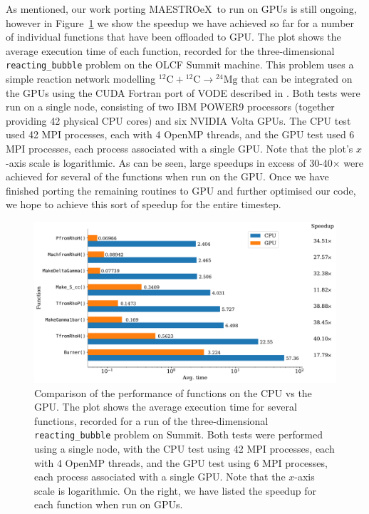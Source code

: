 \documentclass[a4paper]{jpconf}
\newcommand{\maestroex}{{\sffamily MAESTROeX}}
\begin{document}
As mentioned, our work porting \maestroex~to run on GPUs is still ongoing, however in Figure~\ref{fig:gpu_speedup} we show the speedup we have achieved so far for a number of individual functions that have been offloaded to GPU. The plot shows the average execution time of each function, recorded for the three-dimensional \texttt{reacting\_bubble} problem on the OLCF Summit machine.
This problem uses a simple reaction network modelling $^{12}\mathrm{C} + {}^{12}\mathrm{C} \rightarrow {}^{24}\mathrm{Mg}$ that can be integrated on the GPUs using the CUDA Fortran port of VODE \citep{vode} described in \cite{Zingale2018}.
Both tests were run on a single node, consisting of two IBM POWER9 processors (together providing 42 physical CPU cores) and six NVIDIA Volta GPUs. The CPU test used 42 MPI processes, each with 4 OpenMP threads, and the GPU test used 6 MPI processes, each process associated with a single GPU.
Note that the plot's $x$-axis scale is logarithmic. As can be seen, large speedups in excess of 30-40$\times$ were achieved for several of the functions when run on the GPU. Once we have finished porting the remaining routines to GPU and further optimised our code, we hope to achieve this sort of speedup for the entire timestep.

\begin{figure}
    \centering
    \includegraphics[width=\textwidth]{plots/gpu_speedup}
    \caption{Comparison of the performance of functions on the CPU vs the GPU. The plot shows the average execution time for several functions, recorded for a run of the three-dimensional \texttt{reacting\_bubble} problem on Summit. Both tests were performed using a single node, with the CPU test using 42 MPI processes, each with 4 OpenMP threads, and the GPU test using 6 MPI processes, each process associated with a single GPU. Note that the $x$-axis scale is logarithmic. On the right, we have listed the speedup for each function when run on GPUs.}\label{fig:gpu_speedup}
\end{figure}
\end{document}
